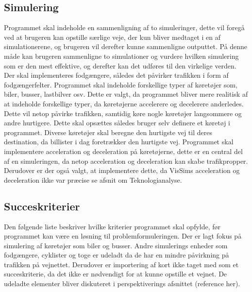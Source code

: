 \vspace{5mm}

\subsection{Simulering}
Programmet skal indeholde en sammenligning af to simuleringer, dette vil foregå ved at brugeren kan opstille særlige veje, der kun bliver medtaget i en af simulationerene, og brugeren vil derefter kunne sammenligne outputtet. På denne måde kan brugeren sammenligne to simulationer og vurdere hvilken simulering som er den mest effektive, og derefter kan det udføres til den virkelige verden. Der skal implementeres fodgængere, således det påvirker trafikken i form af fodgængerfelter. Programmet skal indeholde forskellige typer af køretøjer som, biler, busser, lastbilver osv. Dette er valgt, da programmet bliver mere realitisk af at indeholde forskellige typer, da køretøjerne accelerere og decelerere anderledes. Dette vil netop påvirke trafikken, samtidig køre nogle køretøjer langsommere og andre hurtigere. Dette skal opsættes således bruger selv definere et køretøj i programmet.  Diverse køretøjer skal beregne den hurtigste vej til deres destination, da billister i dag foretrækker den hurtigste vej. Programmet skal implementere acceleration og deceleration på køretøjerne, dette er en central del af en simuleringen, da netop acceleration og deceleration kan skabe trafikpropper. Derudover er der også valgt, at implementere dette, da VisSims acceleration og deceleration ikke var præcise se afsnit om Teknologianalyse. 

\vspace{5mm}

\subsection{Succeskriterier}\label{Succeskriterier}
Den følgende liste beskriver hvilke kriterier programmet skal opfylde, før programmet kan være en løsning til problemformuleringen. Der er lagt fokus på simulering af køretøjer som biler og busser. Andre simulerings enheder som fodgængere, cyklister og toge er udeladt da de har en mindre påvirkning på trafikken på vejnettet. Derudover er importering af kort ikke taget med som et succeskriterie, da det ikke er nødvendigt for at kunne opstille et vejnet. De udeladte elementer bliver diskuteret i perspektiverings afsnittet (reference her).

